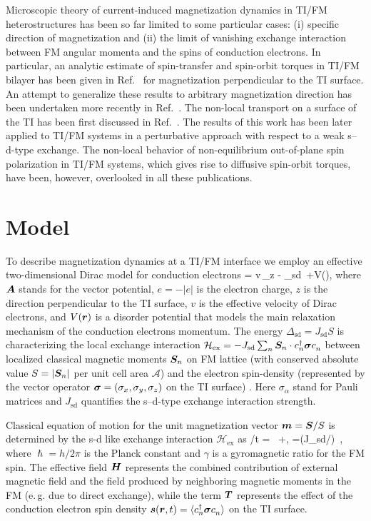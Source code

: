 Microscopic theory of current-induced magnetization dynamics in TI/FM heterostructures has been so far limited to some particular cases: (i) specific direction of magnetization and (ii) the limit of vanishing exchange interaction between FM angular momenta and the spins of conduction electrons.  In particular, an analytic estimate of spin-transfer and spin-orbit torques in TI/FM bilayer has been given in Ref.~\cite{sakai_spin_2014} for magnetization perpendicular to the TI surface. An attempt to generalize these results to arbitrary magnetization direction has been undertaken more recently in Ref.~\cite{ndiaye_dirac_2017}.  The non-local transport on a surface of the TI has been first discussed in Ref.~\cite{burkov_spin_2010-1}. The results of this work has been later applied to TI/FM systems \cite{taguchi_spin-charge_2015,shintani_spin_2016} in a perturbative approach with respect to a weak s--d-type exchange. The non-local behavior of non-equilibrium out-of-plane spin polarization in TI/FM systems, which gives rise to diffusive spin-orbit torques, have been, however, overlooked in all these publications. 

\section{Model}
To describe magnetization dynamics at a TI/FM interface we employ an effective two-dimensional Dirac model for conduction electrons 
\be
\label{TImodel}
= v\,_z - \Delta_\textrm{sd}\, \cdot \bb{\sigma} +V(),
\e
where $\boldsymbol{A}$ stands for the vector potential, $e=-|e|$ is the electron charge, $z$ is the direction perpendicular to the TI surface, $v$ is the effective velocity of Dirac electrons, and $V(\boldsymbol{r})$ is a disorder potential that models the main relaxation mechanism of the conduction electrons momentum. The energy $\Delta_{\textrm{sd}}=J_\textrm{sd} S$ is characterizing the local exchange interaction $\mathcal{H}_\textrm{ex}=-J_\textrm{sd} \sum_n  \bb{S}_n \cdot c\h_n \bb{\sigma}c\0_n$ between localized classical magnetic moments $\boldsymbol{S}_n$ on FM lattice (with conserved absolute value $S=|\boldsymbol{S}_n|$ per unit cell area $\mathcal{A}$) and the electron spin-density  (represented by the vector operator $\boldsymbol{\sigma} = (\sigma_x,\sigma_y,\sigma_z)$ on the TI surface) \cite{sdmodel}. Here $\sigma_\alpha$ stand for Pauli matrices and $J_\textrm{sd}$ quantifies the s--d-type exchange interaction strength.  

Classical equation of motion for the unit magnetization vector $\boldsymbol{m}=\boldsymbol{S}/S$ is determined by the s-d like exchange interaction $\mathcal{H}_\textrm{ex}$ as
\be
\label{Eom}
\pa {}/\pa t = \gamma\,  \times{}+,\quad
{}=(J_\textrm{sd}/\hslash) \,\times{},
\e
where $\hslash=h/2\pi$ is the Planck constant and $\gamma$ is a gyromagnetic ratio for the FM spin. The effective field $\boldsymbol{H}$ represents the combined contribution of external magnetic field and the field produced by neighboring magnetic moments in the FM (e.\,g. due to direct exchange), while the term $\boldsymbol{T}$ represents the effect of the conduction electron spin density $\bb{s}(\bb{r},t)= \la c\h_n \bb{\sigma} c\0_n\ra$  on the TI surface. 

